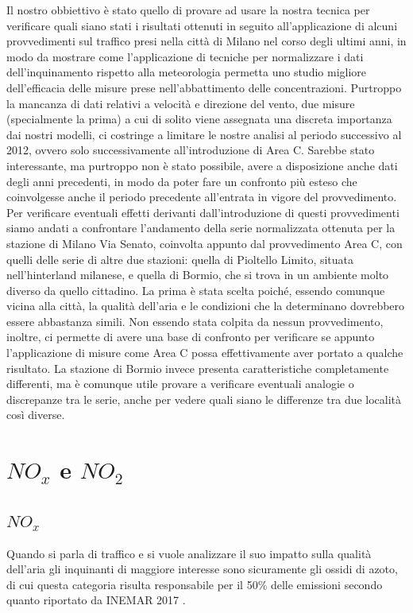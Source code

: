 Il nostro obbiettivo è stato quello di provare ad usare la nostra tecnica per verificare quali siano stati i risultati ottenuti in seguito all'applicazione di alcuni provvedimenti sul traffico presi nella città di Milano nel corso degli ultimi anni, in modo da mostrare come l'applicazione di tecniche per normalizzare i dati dell'inquinamento rispetto alla meteorologia permetta uno studio migliore dell'efficacia delle misure prese nell'abbattimento delle concentrazioni. Purtroppo la mancanza di dati relativi a velocità e direzione del vento, due misure (specialmente la prima) a cui di solito viene assegnata una discreta importanza dai nostri modelli, ci costringe a limitare le nostre analisi al periodo successivo al 2012, ovvero solo successivamente all'introduzione di Area C. Sarebbe stato interessante, ma purtroppo non è stato possibile, avere a disposizione anche dati degli anni precedenti, in modo da poter fare un confronto più esteso che coinvolgesse anche il periodo precedente all'entrata in vigore del provvedimento.
Per verificare eventuali effetti derivanti dall'introduzione di questi provvedimenti siamo andati a confrontare l'andamento della serie normalizzata ottenuta per la stazione di Milano Via Senato, coinvolta appunto dal provvedimento Area C, con quelli delle serie di altre due stazioni: quella di Pioltello Limito, situata nell'hinterland milanese, e quella di Bormio, che si trova in un ambiente molto diverso da quello cittadino. La prima è stata scelta poiché, essendo comunque vicina alla città, la qualità dell'aria e le condizioni che la determinano dovrebbero essere abbastanza simili. Non essendo stata colpita da nessun provvedimento, inoltre, ci permette di avere una base di confronto per verificare se appunto l'applicazione di misure come Area C possa effettivamente aver portato a qualche risultato. La stazione di Bormio invece presenta caratteristiche completamente differenti, ma è comunque utile provare a verificare eventuali analogie o discrepanze tra le serie, anche per vedere quali siano le differenze tra due località così diverse.

\section{$NO_x$ e $NO_2$}
\subsection{$NO_x$}
Quando si parla di traffico e si vuole analizzare il suo impatto sulla qualità dell'aria gli inquinanti di maggiore interesse sono sicuramente gli ossidi di azoto, di cui questa categoria risulta responsabile per il 50\% delle emissioni secondo quanto riportato da INEMAR 2017 \cite{inemar2017}.

